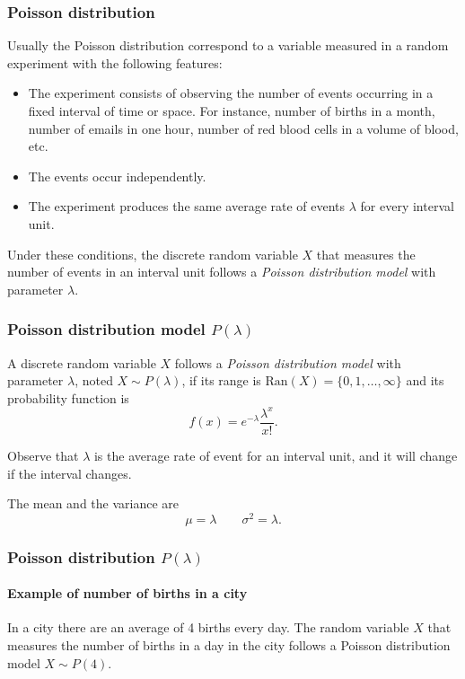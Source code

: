 \begin{frame}
\frametitle{Poisson distribution}
Usually the Poisson distribution correspond to a variable measured in a random experiment with the following features:
\begin{itemize}
\item The experiment consists of observing the number of events occurring in a fixed interval of time or space.
For instance, number of births in a month, number of emails in one hour, number of red blood cells in a volume of blood, etc. 
\item The events occur independently.
\item The experiment produces the same average rate of events $\lambda$ for every interval unit. 
\end{itemize}
Under these conditions, the discrete random variable $X$ that measures the number of events in an interval unit follows a \emph{Poisson distribution model} with parameter $\lambda$.
\end{frame}


\begin{frame}
\frametitle{Poisson distribution model $P(\lambda)$}
\begin{definition}
A discrete random variable $X$ follows a \emph{Poisson distribution model} with parameter $\lambda$, noted 
$X\sim P(\lambda)$, if its range is $\mbox{Ran}(X) = \{0,1,\ldots,\infty\}$ and its probability function is
\[
f(x) = e^{-\lambda}\frac{\lambda^x}{x!}.
\]
\end{definition}

Observe that $\lambda$ is the average rate of event for an interval unit, and it will change if the interval changes.

The mean and the variance are
\[
\mu = \lambda \qquad \sigma^2 = \lambda.
\]
\end{frame}


\begin{frame}
\frametitle{Poisson distribution $P(\lambda)$}
\framesubtitle{Example of number of births in a city}
In a city there are an average of 4 births every day. 
The random variable $X$ that measures the number of births in a day in the city follows a Poisson distribution model $X\sim P(4)$.
\begin{center}
\end{center}
\end{frame}


